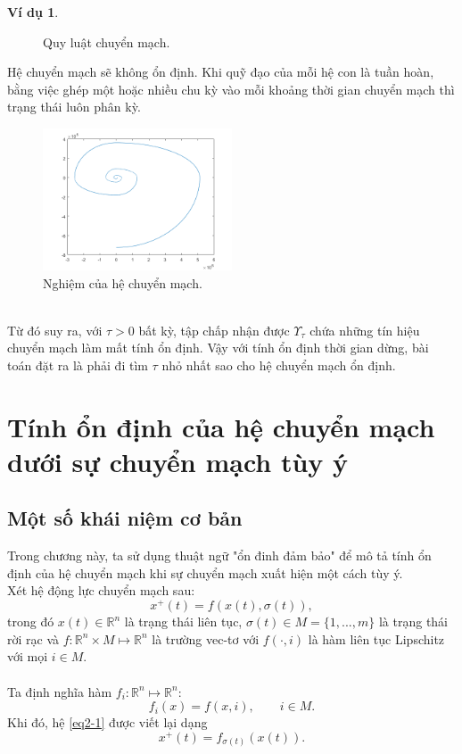 \documentclass[14pt,a4paper,oneside]{report}		%
\theoremstyle{definition}
\newtheorem{example}[theorem]{Ví dụ}
\begin{document}
\begin{example}
\begin{figure}[h]
\caption{Quy luật chuyển mạch.}\label{fig:9}
\end{figure}
Hệ chuyển mạch sẽ không ổn định. Khi quỹ đạo của mỗi hệ con là tuần hoàn, bằng việc ghép một hoặc nhiều chu kỳ vào mỗi khoảng thời gian chuyển mạch thì trạng thái luôn phân kỳ.\\
\begin{figure}[h]
\centering
\includegraphics[width=0.5\textwidth]{graph11.png}
\caption{Nghiệm của hệ chuyển mạch.}\label{fig:10}
\end{figure}\\
Từ đó suy ra, với $\tau > 0$ bất kỳ, tập chấp nhận được $\Upsilon_\tau$ chứa những tín hiệu chuyển mạch làm mất tính ổn định. Vậy với tính ổn định thời gian dừng, bài toán đặt ra là phải đi tìm $\tau$ nhỏ nhất sao cho hệ chuyển mạch ổn định.
\end{example}

\chapter{Tính ổn định của hệ chuyển mạch dưới sự chuyển mạch tùy ý}
\section{Một số khái niệm cơ bản}
Trong chương này, ta sử dụng thuật ngữ "ổn đinh đảm bảo" để mô tả tính ổn định của hệ chuyển mạch khi sự chuyển mạch xuất hiện một cách tùy ý.\\

Xét hệ động lực chuyển mạch sau:
\begin{equation} \label{eq2-1}
x^+(t)=f(x(t),\sigma (t)),
\end{equation}
trong đó $x(t)\in\mathbb{R}^n$ là trạng thái liên tục, $\sigma (t)\in M = \{1,...,m\}$ là trạng thái rời rạc và $f : \mathbb{R}^n \times M \mapsto \mathbb{R}^n$ là trường vec-tơ với $f(\cdot ,i)$ là hàm liên tục Lipschitz với mọi $i\in M$.\\\\
Ta định nghĩa hàm $f_i : \mathbb{R}^n \mapsto \mathbb{R}^n$:
$$f_i(x)=f(x,i), \qquad i\in M.$$
Khi đó, hệ \ref{eq2-1} được viết lại dạng
\begin{equation} \label{eq2-2}
x^+(t)=f_{\sigma (t)}(x(t)).
\end{equation}
\end{document}
